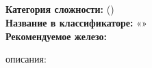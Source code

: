 \begin{samepage}
  \section{\routeTitle}
  \noindent \textbf{Категория сложности:} \routeCategory (\routeType)\\
  \noindent \textbf{Название в классификаторе:} «\routeName»\\
  \noindent \textbf{Рекомендуемое железо:} \routeEquipment

  \hspace{1em}
\end{samepage}


\routeDescription{}

\vspace{1em}
\hfill { описания: \routeAuthors}
